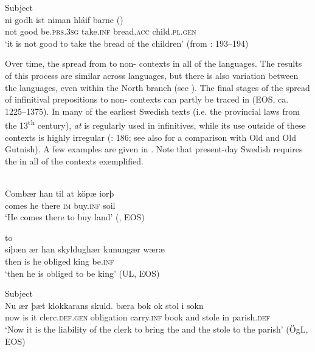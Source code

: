 \documentclass[output=paper]{langscibook}
\begin{document}
\ex Subject\\ \label{ex:kalm:3c}
\gll ni godh ist niman hláif barne ()\\
not good be.\textsc{prs.3sg} take.\textsc{inf} bread.\textsc{acc} child.\textsc{pl.gen}\\
\glt‘it is not good to take the bread of the children’ (from \citealt{Wright1954}: 193–194)
\z
\z

Over time, the  spread from  to non- contexts in all of the  languages. The results of this process are similar across  languages, but there is also variation between the languages, even within the North  branch (see \citealt{Haspelmath1989,Los2005,Kalm2016Prepositioner, Kalm2016Satsekvivalenta,Kalm2019}). The final stages of the spread of infinitival prepositions to non- contexts can partly be traced in  (EOS, ca. 1225–1375). In many of the earliest Swedish texts (i.e. the provincial laws from the 13\textsuperscript{th} century), \textit{at} is regularly used in  infinitives, while its use outside of these contexts is highly irregular (\citealt{Kalm2016Satsekvivalenta}: 186; see also \citealt{Kalm2019} for a comparison with Old  and Old Gutnish). A few examples are given in . Note that present-day Swedish requires the  in all of the contexts exemplified.\pagebreak


\ea
\label{ex:kalm:4}
\ea {}\\\label{ex:kalm:4a}
\gll Combær han til at köpæ iorþ\\ 
comes he there \textsc{im} buy.\textsc{inf} soil\\
\glt‘He comes there to buy land’ (, EOS) 

\ex {} to \\\label{ex:kalm:4b}
\gll siþæn ær han skyldughær kunungær wæræ\\
 then is he obliged king be.\textsc{inf}\\
\glt ‘then he is obliged to be king’ (UL, EOS)
 
\ex Subject\\\label{ex:kalm:4c}
\gll Nu ær þæt klokkarans skuld. bæra bok ok stol i sokn\\
now is it clerc.\textsc{def.gen} obligation carry.\textsc{inf} book and stole in parish.\textsc{def}\\
\glt ‘Now it is the liability of the clerk to bring the  and the stole to the parish’ (ÖgL, EOS)
\z 
\z 
\end{document}
